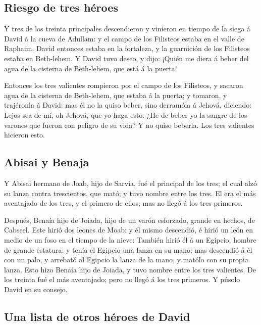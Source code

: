 \hypertarget{riesgo-de-tres-huxe9roes}{%
\subsection{Riesgo de tres héroes}\label{riesgo-de-tres-huxe9roes}}

 Y tres de los treinta principales descendieron y vinieron
en tiempo de la siega á David á la cueva de Adullam: y el campo de los
Filisteos estaba en el valle de Raphaim.  David entonces
estaba en la fortaleza, y la guarnición de los Filisteos estaba en
Beth-lehem.  Y David tuvo deseo, y dijo: ¡Quién me diera á
beber del agua de la cisterna de Beth-lehem, que está á la puerta!

 Entonces los tres valientes rompieron por el campo de los
Filisteos, y sacaron agua de la cisterna de Beth-lehem, que estaba á la
puerta; y tomaron, y trajéronla á David: mas él no la quiso beber, sino
derramóla á Jehová, diciendo:  Lejos sea de mí, oh Jehová,
que yo haga esto. ¿He de beber yo la sangre de los varones que fueron
con peligro de su vida? Y no quiso beberla. Los tres valientes hicieron
esto.

\hypertarget{abisai-y-benaja}{%
\subsection{Abisai y Benaja}\label{abisai-y-benaja}}

 Y Abisai hermano de Joab, hijo de Sarvia, fué el principal
de los tres; el cual alzó su lanza contra trescientos, que mató; y tuvo
nombre entre los tres.  El era el más aventajado de los
tres, y el primero de ellos; mas no llegó á los tres primeros.

 Después, Benaía hijo de Joiada, hijo de un varón
esforzado, grande en hechos, de Cabseel. Este hirió dos leones de Moab:
y él mismo descendió, é hirió un león en medio de un foso en el tiempo
de la nieve:  También hirió él á un Egipcio, hombre de
grande estatura: y tenía el Egipcio una lanza en su mano; mas descendió
á él con un palo, y arrebató al Egipcio la lanza de la mano, y matólo
con su propia lanza.  Esto hizo Benaía hijo de Joiada, y
tuvo nombre entre los tres valientes.  De los treinta fué
el más aventajado; pero no llegó á los tres primeros. Y púsolo David en
su consejo.

\hypertarget{una-lista-de-otros-huxe9roes-de-david}{%
\subsection{Una lista de otros héroes de
David}\label{una-lista-de-otros-huxe9roes-de-david}}

